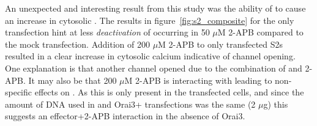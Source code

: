 An unexpected and interesting result from this study was the ability of \stim{} to cause an increase in cytosolic \Ca{}. The results in figure~\ref{fig:s2_composite} for the \stim{} only transfection hint at less \emph{deactivation} of \dorai{} occurring in 50 $\mu$M 2-APB  compared to the mock transfection. Addition of 200 $\mu$M 2-APB to \stim{} only transfected S2s resulted in a clear increase in cytosolic calcium indicative of channel opening.  
One explanation is that another \Ca{} channel opened due to the combination of \stim{} and 2-APB. It may also be that 200 $\mu$M 2-APB is interacting with \stim{} leading to non-specific effects on \dorai. 
As this is only present in the \stim{} transfected cells, and since the amount of \stim{} DNA used in \stim{} and Orai3+\stim{} transfections was the same (2 $\mu$g) this suggests an effector+2-APB interaction in the absence of Orai3. 






